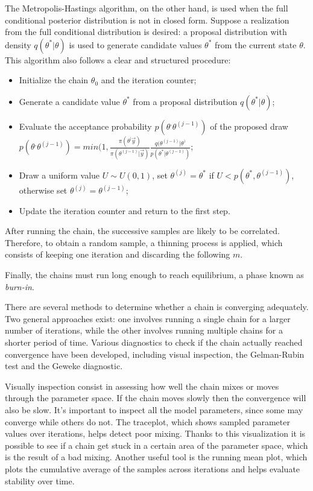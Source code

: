 \documentclass{Class/julia}
\begin{document}
The Metropolis-Hastings algorithm, on the other hand, is used when the full conditional posterior distribution is not in closed form. Suppose a realization from the full conditional distribution is desired: a proposal distribution with density \( q(\theta^* | \theta) \) is used to generate candidate values \( \theta^* \) from the current state \( \theta \). This algorithm also follows a clear and structured procedure:

\begin{itemize}
  \item Initialize the chain \( \theta_0 \) and the iteration counter;
  \item Generate a candidate value \( \theta^* \) from a proposal distribution \( q(\theta^* | \theta) \);
  \item Evaluate the acceptance probability \( p(\theta^, \theta^{(j-1)}) \) of the proposed draw \( p(\theta^,\theta^{(j-1)})=min(1,\frac{\pi(\theta^|\vec y)}{\pi(\theta^{(j-1)}|\vec y)}\frac{q(\theta^{(j-1)}|\theta^)}{p(\theta^*|\theta^{(j-1)})}\);
  \item Draw a uniform value \( U \sim U(0,1) \), set \( \theta^{(j)} = \theta^* \) if \( U < p(\theta^*, \theta^{(j-1)}) \), otherwise set \( \theta^{(j)} = \theta^{(j-1)} \);
  \item Update the iteration counter and return to the first step.
\end{itemize}

After running the chain, the successive samples are likely to be correlated. Therefore, to obtain a random sample, a thinning process is applied, which consists of keeping one iteration and discarding the following \( m \).

Finally, the chains must run long enough to reach equilibrium, a phase known as \textit{burn-in}.

There are several methods to determine whether a chain is converging adequately. 
Two general approaches exist: one involves running a single chain for a larger number of iterations, while the other involves running multiple chains for a shorter period of time.
Various diagnostics to check if the chain actually reached convergence have been developed, including visual inspection, the Gelman-Rubin test and the Geweke diagnostic.

Visually inspection consist in assessing how well the chain mixes or moves through the parameter space. If the chain moves slowly then the convergence will also be slow. It's important to inspect all the model parameters, since some may converge while others do not. The traceplot, which shows sampled parameter values over iterations, helps detect poor mixing. Thanks to this visualization it is possible to see if a chain get stuck in a certain area of the parameter space, which is the result of a bad mixing.  Another useful tool is the running mean plot, which plots the cumulative average of the samples across iterations and helps evaluate stability over time. 
\end{document}

